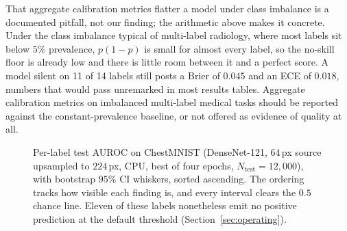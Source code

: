 \documentclass[conference]{IEEEtran}
\begin{document}
That aggregate calibration metrics flatter a model under class imbalance is a
documented pitfall, not our finding; the arithmetic above makes it concrete. Under
the class imbalance typical of multi-label radiology, where most labels sit below
$5\%$ prevalence, $p(1-p)$ is small for almost every label, so the no-skill floor
is already low and there is little room between it and a perfect score. A model
silent on 11 of 14 labels still posts a Brier of $0.045$ and an ECE of $0.018$,
numbers that would pass unremarked in most results tables. Aggregate calibration
metrics on imbalanced multi-label medical tasks should be reported against the
constant-prevalence baseline, or not offered as evidence of quality at all.

\begin{figure}[tbp]
\centering
{}
\caption{Per-label test AUROC on ChestMNIST (DenseNet-121, $64$\,px source upsampled
to $224$\,px, CPU, best of four epochs, $N_{\text{test}}{=}12{,}000$), with
bootstrap $95\%$ CI whiskers, sorted ascending. The ordering tracks how visible
each finding is, and every interval clears the $0.5$ chance line. Eleven of these
labels nonetheless emit no positive prediction at the default threshold
(Section~\ref{sec:operating}).}
\label{fig:cxr-auroc}
\end{figure}
\end{document}
